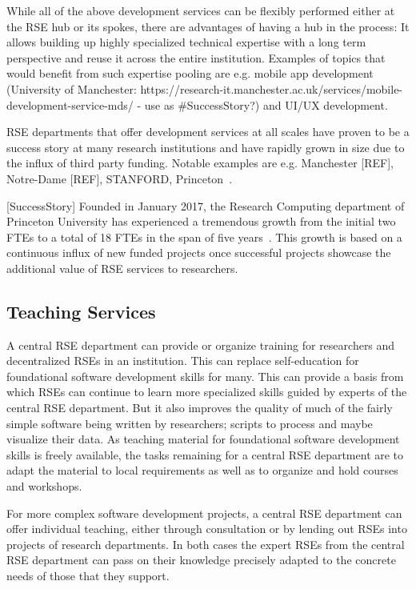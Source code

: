 \documentclass{article}
\begin{document}
While all of the above development services can be flexibly performed either at the RSE hub or its spokes, there are advantages of having a hub in the process:
It allows building up highly specialized technical expertise with a long term perspective and reuse it across the entire institution.
Examples of topics that would benefit from such expertise pooling are e.g. mobile app development (University of Manchester: https://research-it.manchester.ac.uk/services/mobile-development-service-mds/ - use as \#SuccessStory?) and UI/UX development.

RSE departments that offer development services at all scales have proven to be a success story at many research institutions and have rapidly grown in size due to the influx of third party funding.
Notable examples are e.g. Manchester [REF], Notre-Dame [REF], STANFORD, Princeton~\autocite{Cosden2022}.

[SuccessStory]
Founded in January 2017, the Research Computing department of Princeton University has experienced a tremendous growth from the initial two FTEs to a total of 18 FTEs in the span of five years~\autocite{Cosden2022}.
This growth is based on a continuous influx of new funded projects once successful projects showcase the additional value of RSE services to researchers.

\subsection{Teaching Services}

A central RSE department can provide or organize training for researchers and decentralized RSEs in an institution.
This can replace self-education for foundational software development skills for many.
This can provide a basis from which RSEs can continue to learn more specialized skills guided by experts of the central RSE department.
But it also improves the quality of much of the fairly simple software being written by researchers; scripts to process and maybe visualize their data.
As teaching material for foundational software development skills is freely available, the tasks remaining for a central RSE department are to adapt the material to local requirements as well as to organize and hold courses and workshops.

For more complex software development projects, a central RSE department can offer individual teaching, either through consultation or by lending out RSEs into projects of research departments.
In both cases the expert RSEs from the central RSE department can pass on their knowledge precisely adapted to the concrete needs of those that they support.
\end{document}

